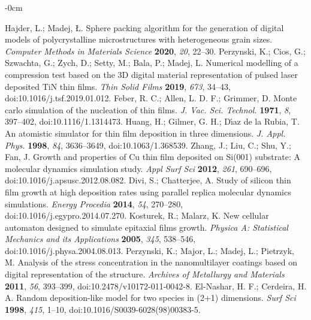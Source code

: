 \documentclass[journal,article,submit,pdftex,moreauthors]{Definitions/mdpi}
\begin{document}
\begin{adjustwidth}{-\extralength}{0cm}
\begin{thebibliography}{999}
Hajder, L.; Madej, Ł. Sphere packing algorithm for the generation of digital models of polycrystalline microstructures with heterogeneous grain sizes. \textit{Computer Methods in Materials Science} \textbf{2020}, \textit{20}, 22–30.
Perzynski, K.; Cios, G.; Szwachta, G.; Zych, D.; Setty, M.; Bala, P.; Madej, L. Numerical modelling of a compression test based on the 3D digital material representation of pulsed laser deposited TiN thin films. \textit{Thin Solid Films} \textbf{2019}, \textit{673}, 34–43, doi:10.1016/j.tsf.2019.01.012.
Feber, R. C.; Allen, L. D. F.; Grimmer, D. Monte carlo simulation of the nucleation of thin films. \textit{J. Vac. Sci. Technol.} \textbf{1971}, \textit{8}, 397–402, doi:10.1116/1.1314473.
Huang, H.; Gilmer, G. H.; Dı́az de la Rubia, T. An atomistic simulator for thin film deposition in three dimensions. \textit{J. Appl. Phys.} \textbf{1998}, \textit{84}, 3636–3649, doi:10.1063/1.368539.
Zhang, J.; Liu, C.; Shu, Y.; Fan, J. Growth and properties of Cu thin film deposited on Si(001) substrate: A molecular dynamics simulation study. \textit{Appl Surf Sci} \textbf{2012}, \textit{261}, 690–696, doi:10.1016/j.apsusc.2012.08.082.
Divi, S.; Chatterjee, A. Study of silicon thin film growth at high deposition rates using parallel replica molecular dynamics simulations. \textit{Energy Procedia} \textbf{2014}, \textit{54}, 270–280, doi:10.1016/j.egypro.2014.07.270.
Kosturek, R.; Malarz, K. New cellular automaton designed to simulate epitaxial films growth. \textit{Physica A: Statistical Mechanics and its Applications} \textbf{2005}, \textit{345}, 538–546, doi:10.1016/j.physa.2004.08.013.
Perzynski, K.; Major, L.; Madej, L.; Pietrzyk, M. Analysis of the stress concentration in the nanomultilayer coatings based on digital representation of the structure. \textit{Archives of Metallurgy and Materials} \textbf{2011}, \textit{56}, 393–399, doi:10.2478/v10172-011-0042-8.
El-Nashar, H. F.; Cerdeira, H. A. Random deposition-like model for two species in (2+1) dimensions. \textit{Surf Sci} \textbf{1998}, \textit{415}, 1–10, doi:10.1016/S0039-6028(98)00383-5.

\end{thebibliography}
\end{adjustwidth}
\end{document}
